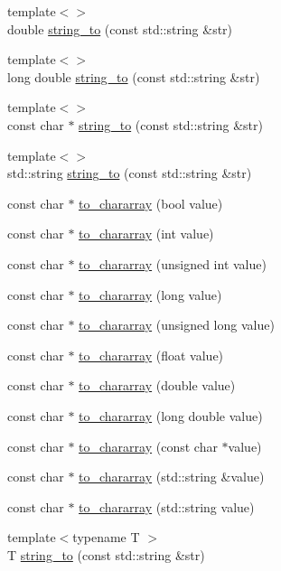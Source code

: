 \begin{DoxyCompactItemize}
\item 
{\footnotesize template$<$$>$ }\\double \hyperlink{namespacemaudio_a96c3aecf18a9fa43d1ecb41f445482d0}{string\-\_\-to} (const std\-::string \&str)
\item 
{\footnotesize template$<$$>$ }\\long double \hyperlink{namespacemaudio_a4a4fa78ac676b4969728895f284ce4a6}{string\-\_\-to} (const std\-::string \&str)
\item 
{\footnotesize template$<$$>$ }\\const char $\ast$ \hyperlink{namespacemaudio_afc2d89a574edb3650b6b2bb642225238}{string\-\_\-to} (const std\-::string \&str)
\item 
{\footnotesize template$<$$>$ }\\std\-::string \hyperlink{namespacemaudio_a99d2dbf8effeebcb3951e6172884a436}{string\-\_\-to} (const std\-::string \&str)
\item 
const char $\ast$ \hyperlink{namespacemaudio_a90a237e15fa1fb5e77bb319c524a5556}{to\-\_\-chararray} (bool value)
\item 
const char $\ast$ \hyperlink{namespacemaudio_a4bd0aafefbb7c6a2cf4b942b8f7be55c}{to\-\_\-chararray} (int value)
\item 
const char $\ast$ \hyperlink{namespacemaudio_a6db3ff2e1c66db2726185ae353b48d4d}{to\-\_\-chararray} (unsigned int value)
\item 
const char $\ast$ \hyperlink{namespacemaudio_a571f26cfe629a0e28d7339f0b824d45a}{to\-\_\-chararray} (long value)
\item 
const char $\ast$ \hyperlink{namespacemaudio_ae308c72ddbc695da52b13a5011000631}{to\-\_\-chararray} (unsigned long value)
\item 
const char $\ast$ \hyperlink{namespacemaudio_ade6a669f23342847850f5753b38bacfa}{to\-\_\-chararray} (float value)
\item 
const char $\ast$ \hyperlink{namespacemaudio_a5696c3a9795765a0e529d60f340fa77a}{to\-\_\-chararray} (double value)
\item 
const char $\ast$ \hyperlink{namespacemaudio_a152b1c802d96ec4b91fdb6fbe68d5a1b}{to\-\_\-chararray} (long double value)
\item 
const char $\ast$ \hyperlink{namespacemaudio_a6cbaaf1b09f9435f90f19186bf75109b}{to\-\_\-chararray} (const char $\ast$value)
\item 
const char $\ast$ \hyperlink{namespacemaudio_a2a9f7fb212e0b3720b33f931fdd6bbf7}{to\-\_\-chararray} (std\-::string \&value)
\item 
const char $\ast$ \hyperlink{namespacemaudio_a4a5356f1446d1a6438f4ac4e566cee5e}{to\-\_\-chararray} (std\-::string value)
\item 
{\footnotesize template$<$typename T $>$ }\\T \hyperlink{namespacemaudio_aaacffcb867e5c649e955b53ddfaf4ac4}{string\-\_\-to} (const std\-::string \&str)
\end{DoxyCompactItemize}


